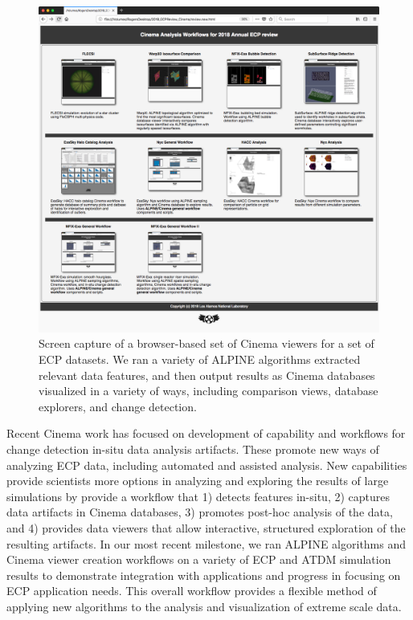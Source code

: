 \begin{figure}[htb]
	\centering
	\includegraphics[width=5in]{projects/2.3.4-DataViz/2.3.4.02-LANL-ATDM-DataViz/ECPReviewScreenshot.png}
	\caption{
        Screen capture of a browser-based set of Cinema viewers 
        for a set of ECP datasets. We ran a variety of ALPINE algorithms
        extracted relevant data features, and then output 
        results as Cinema databases visualized in
        a variety of ways, including comparison views, database
        explorers, and change detection.
    }
\end{figure}

Recent Cinema work has focused on development of capability
and workflows for change detection in-situ data analysis artifacts. These
promote new ways of analyzing ECP data, including
automated and assisted analysis. New capabilities provide 
scientists more options in analyzing and exploring the results of large
simulations by provide a workflow that 1) detects features in-situ, 2)
captures data artifacts in Cinema databases, 3) promotes
post-hoc analysis of the data, and 4)
provides data viewers that allow interactive, structured exploration of the
resulting artifacts. In our most recent milestone, we ran
ALPINE algorithms and Cinema viewer creation workflows on a variety of
ECP and ATDM simulation results to demonstrate integration with applications
and progress in focusing on ECP application needs.
This overall workflow provides a
flexible method of applying new algorithms to the analysis and visualization
of extreme scale data.

